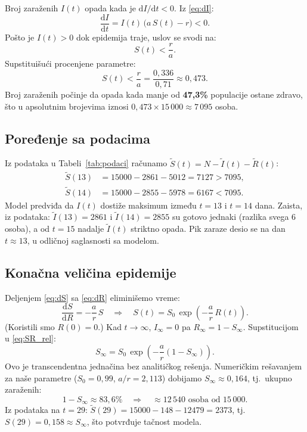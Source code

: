\documentclass[12pt,a4paper]{article}
\begin{document}
	Broj zaraženih $I(t)$ opada kada je $\mathrm{d}I/\mathrm{d}t<0$. Iz \eqref{eq:dI}:
	\begin{equation}
		\frac{\mathrm{d}I}{\mathrm{d}t} = I(t)\,\bigl(a\,S(t)-r\bigr) < 0.
	\end{equation}
	Pošto je $I(t)>0$ dok epidemija traje, uslov se svodi na:
	\begin{equation}
		\boxed{S(t) < \frac{r}{a}.}
		\label{eq:uslov_pad}
	\end{equation}
	Supstituišući procenjene parametre:
	\begin{equation}
		S(t) < \frac{r}{a} = \frac{0{,}336}{0{,}71} \approx 0{,}473.
	\end{equation}
	Broj zaraženih počinje da opada kada manje od \textbf{47,3\%} populacije ostane zdravo, što
	u apsolutnim brojevima iznosi $0{,}473\times 15\,000\approx 7\,095$ osoba.
	
	\subsection{Poređenje sa podacima}
	
	Iz podataka u Tabeli~\ref{tab:podaci} računamo $\tilde{S}(t)=N-\tilde{I}(t)-\tilde{R}(t)$:
	\begin{align*}
		\tilde{S}(13) &= 15000 - 2861 - 5012 = 7127 > 7095,\\
		\tilde{S}(14) &= 15000 - 2855 - 5978 = 6167 < 7095.
	\end{align*}
	Model predviđa da $I(t)$ dostiže maksimum između $t=13$ i $t=14$ dana. Zaista, iz podataka:
	$\tilde{I}(13)=2861$ i $\tilde{I}(14)=2855$ su gotovo jednaki (razlika svega 6 osoba), a od
	$t=15$ nadalje $\tilde{I}(t)$ striktno opada. Pik zaraze desio se na dan $t\approx 13$,
	u odličnoj saglasnosti sa modelom.
	
	\subsection{Konačna veličina epidemije}
	
	Deljenjem \eqref{eq:dS} sa \eqref{eq:dR} eliminišemo vreme:
	\begin{equation}
		\frac{\mathrm{d}S}{\mathrm{d}R} = -\frac{a}{r}\,S
		\quad\Rightarrow\quad
		S(t) = S_0\,\exp\!\left(-\frac{a}{r}\,R(t)\right).
		\label{eq:SR_rel}
	\end{equation}
	(Koristili smo $R(0)=0$.) Kad $t\to\infty$, $I_\infty=0$ pa $R_\infty=1-S_\infty$.
	Supstitucijom u \eqref{eq:SR_rel}:
	\begin{equation}
		S_\infty = S_0\,\exp\!\left(-\frac{a}{r}(1-S_\infty)\right).
		\label{eq:final_size}
	\end{equation}
	Ovo je transcendentna jednačina bez analitičkog rešenja. Numeričkim rešavanjem za naše
	parametre ($S_0=0{,}99$, $a/r=2{,}113$) dobijamo $S_\infty\approx 0{,}164$, tj.\ ukupno
	zaraženih:
	\begin{equation}
		1-S_\infty \approx 83{,}6\% \quad\Rightarrow\quad
		\approx 12\,540 \text{ osoba od } 15\,000.
	\end{equation}
	Iz podataka na $t=29$: $\tilde{S}(29)=15000-148-12479=2373$, tj.\
	$S(29)=0{,}158\approx S_\infty$, što potvrđuje tačnost modela.
	
\end{document}
